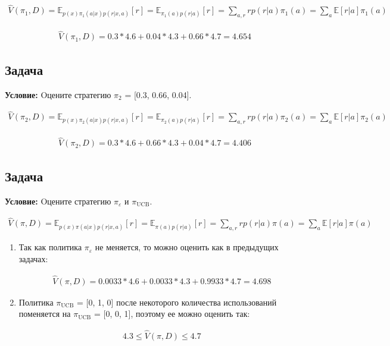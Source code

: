 \documentclass[a4paper,12pt]{article}
\begin{document}
    \begin{align*}
        \hat{V} (\pi_1, D) = \mathbb{E}_{p(x) \pi_1 (a|x) p(r|x, a)}[r] = \mathbb{E}_{\pi_1 (a) p(r|a)}[r] = \sum_{a, r} r p(r|a) \pi_1 (a) = \sum_a \mathbb{E} [r|a] \pi_1 (a)
    \end{align*}

    \begin{align*}
        \hat{V} (\pi_1, D) = 0.3 * 4.6 + 0.04 * 4.3 + 0.66 * 4.7 = 4.654 
    \end{align*}

\subsection{Задача}
    \textbf{Условие:} Oцените стратегию $\pi_2$ = [0.3, 0.66, 0.04].

    \begin{align*}
        \hat{V} (\pi_2, D) = \mathbb{E}_{p(x) \pi_2 (a|x) p(r|x, a)}[r] = \mathbb{E}_{\pi_2 (a) p(r|a)}[r] = \sum_{a, r} r p(r|a) \pi_2 (a) = \sum_a \mathbb{E} [r|a] \pi_2 (a)
    \end{align*}

    \begin{align*}
        \hat{V} (\pi_2, D) = 0.3 * 4.6 + 0.66 * 4.3 + 0.04 * 4.7 = 4.406 
    \end{align*}

\subsection{Задача}
    \textbf{Условие:} Oцените стратегию $\pi_{\varepsilon}$ и $\pi_\text{UCB}$. 

    \begin{align*}
        \hat{V} (\pi, D) = \mathbb{E}_{p(x) \pi (a|x) p(r|x, a)}[r] = \mathbb{E}_{\pi (a) p(r|a)}[r] = \sum_{a, r} r p(r|a) \pi (a) = \sum_a \mathbb{E} [r|a] \pi (a)
    \end{align*}
        
    \begin{enumerate}
        \item Так как политика $\pi_{\varepsilon}$ не меняется, то можно оценить как в предыдущих задачах:

        \begin{align*}
            \hat{V} (\pi, D) = 0.0033 * 4.6 + 0.0033 * 4.3 + 0.9933 * 4.7 = 4.698 
        \end{align*}

        \item Политика $\pi_\text{UCB}$ = [0, 1, 0] после некоторого количества использований поменяется на $\pi_\text{UCB}$ = [0, 0, 1], поэтому ее можно оценить так:

        \begin{align*}
            4.3 \leq \hat{V} (\pi, D) \leq 4.7
        \end{align*}
        
    \end{enumerate}
    
\end{document}
